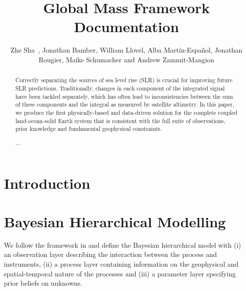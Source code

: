 \documentclass[cmbright,fleqn,referee]{envauth}
\begin{document}
\title{Global Mass Framework Documentation}

\author{Zhe Sha\corrauth\ , Jonathan Bamber, William Llovel, Alba Martín-Español, Jonathan Rougier, Maike Schumacher and Andrew Zammit-Mangion}


\address{Bristol Glaciology Centre, School of Geography, University of Bristol, Bristol, BS8 1SS, UK\\
Building, Institute, Street Address, City, Code, Country\\
Building, Institute, Street Address, City, Code, Country
}

\begin{abstract}
Correctly separating the sources of sea level rise (SLR) is crucial for improving future SLR predictions. Traditionally, changes in each component of the integrated signal have been tackled separately, which has often lead to inconsistencies between the sum of these components and the integral as measured by satellite altimetry. In this paper, we produce the first physically-based and data-driven solution for the complete coupled land-ocean-solid Earth system that is consistent with the full suite of observations, prior knowledge and fundamental geophysical constraints. 

...

\end{abstract}

\maketitle


\section{Introduction}
\label{s:intro}


\section{Bayesian Hierarchical Modelling}
\label{s:model}
We follow the framework in \citet{b1} and define the Bayesian hierarchical model with (i) an observation layer describing the interaction between the process and instruments, (ii) a process layer containing information on the geophysical and spatial-temporal nature of the processes and (iii) a parameter layer specifying prior beliefs on unknowns. 
\end{document}

